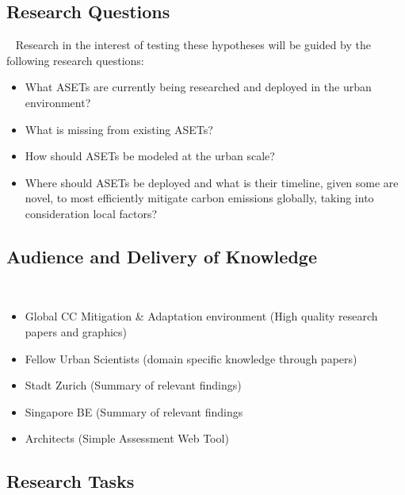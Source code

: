 \subsection{Research Questions}\
Research in the interest of testing these hypotheses will be guided by the following research questions:

\begin{itemize}
	\item What ASETs are currently being researched and deployed in the urban environment?
	\item What is missing from existing ASETs?
	\item How should ASETs be modeled at the urban scale?
	\item Where should ASETs be deployed and what is their timeline, given some are novel, to most efficiently mitigate carbon emissions globally, taking into consideration local factors?
\end{itemize}

\subsection{Audience and Delivery of Knowledge}\

\begin{itemize}
    \item Global CC Mitigation \& Adaptation environment (High quality research papers and graphics)
    \item Fellow Urban Scientists (domain specific knowledge through papers)
    \item Stadt Zurich (Summary of relevant findings)
    \item Singapore BE (Summary of relevant findings
    \item Architects (Simple Assessment Web Tool)
\end{itemize}

\subsection{Research Tasks}\


